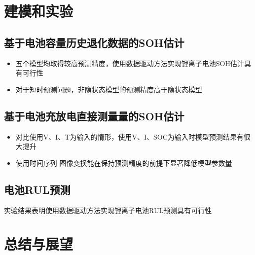 \documentclass{beamer}
\begin{document}
\section{建模和实验}

\subsection{基于电池容量历史退化数据的SOH估计}

\begin{frame}
\end{frame}

\begin{frame}
	\begin{itemize}
		\item 五个模型均取得较高预测精度，使用数据驱动方法实现锂离子电池SOH估计具有可行性
		\item 对于短时预测问题，非隐状态模型的预测精度高于隐状态模型
	\end{itemize}
\end{frame}

\subsection{基于电池充放电直接测量量的SOH估计}

\begin{frame}
\end{frame}

\begin{frame}
	\begin{itemize}
		\item 对比使用V、I、T为输入的情形，使用V、I、SOC为输入时模型预测结果有很大提升
		\item 使用时间序列-图像变换能在保持预测精度的前提下显著降低模型参数量
	\end{itemize}
\end{frame}

\subsection{电池RUL预测}

\begin{frame}
\end{frame}

\begin{frame}
	实验结果表明使用数据驱动方法实现锂离子电池RUL预测具有可行性
\end{frame}

\section{总结与展望}
\end{document}
